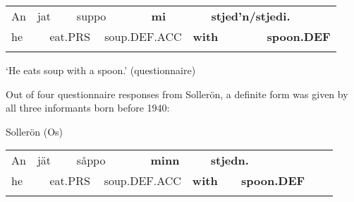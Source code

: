 \begin{tabular}{llllllllll}
\lsptoprule
An & \multicolumn{2}{l}{jat

} & \multicolumn{2}{l}{suppo

} & \multicolumn{2}{l}{{\bfseries mi}

} & \multicolumn{2}{l}{{\bfseries stjed’n/stjedi.}

} & \\
\multicolumn{2}{l}{he

} & \multicolumn{2}{l}{eat.PRS

} & \multicolumn{2}{l}{soup.DEF.ACC

} & \multicolumn{2}{l}{{\bfseries with}

} & \multicolumn{2}{l}{{\bfseries spoon.DEF}

}\\
\lspbottomrule
\end{tabular}

\begin{styleTranslation}
‘He eats soup with a spoon.’ (questionnaire)

\end{styleTranslation}

Out of four questionnaire responses from Sollerön, a definite form was given by all three informants born before 1940:

\begin{listWWNumileveli}
\item {}

\begin{styleExample}
Sollerön (Os)

\end{styleExample}

\end{listWWNumileveli}

\begin{tabular}{llllllllllll}
\lsptoprule
An & \multicolumn{2}{l}{jät

} & \multicolumn{2}{l}{såppo

} & \multicolumn{2}{l}{{\bfseries minn}

} & \multicolumn{2}{l}{{\bfseries stjedn.}

} & \multicolumn{2}{l}{} & \\
\multicolumn{2}{l}{he

} & \multicolumn{2}{l}{eat.PRS

} & \multicolumn{2}{l}{soup.DEF.ACC

} & \multicolumn{2}{l}{{\bfseries with}

} & \multicolumn{2}{l}{{\bfseries spoon.DEF}

} & \multicolumn{2}{l}{}\\
\lspbottomrule
\end{tabular}

